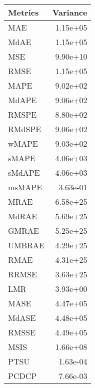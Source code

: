 \begin{tabular}{lr}
\toprule
Metrics & Variance \\
\midrule
MAE & 1.15e+05 \\
MdAE & 1.15e+05 \\
MSE & 9.90e+10 \\
RMSE & 1.15e+05 \\
MAPE & 9.02e+02 \\
MdAPE & 9.06e+02 \\
RMSPE & 8.80e+02 \\
RMdSPE & 9.06e+02 \\
wMAPE & 9.03e+02 \\
sMAPE & 4.06e+03 \\
sMdAPE & 4.06e+03 \\
msMAPE & 3.63e-01 \\
MRAE & 6.58e+25 \\
MdRAE & 5.69e+25 \\
GMRAE & 5.25e+25 \\
UMBRAE & 4.29e+25 \\
RMAE & 4.31e+25 \\
RRMSE & 3.63e+25 \\
LMR & 3.93e+00 \\
MASE & 4.47e+05 \\
MdASE & 4.48e+05 \\
RMSSE & 4.49e+05 \\
MSIS & 1.66e+08 \\
PTSU & 1.63e-04 \\
PCDCP & 7.66e-03 \\
\bottomrule
\end{tabular}

